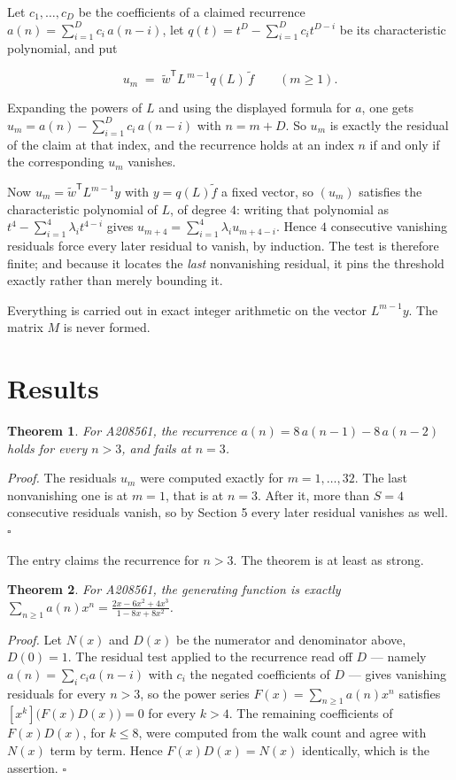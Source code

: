 \documentclass[11pt]{article}
\newtheorem{theorem}{Theorem}
\theoremstyle{definition}
\begin{document}
Let $c_1,\dots,c_D$ be the coefficients of a claimed recurrence $a(n) = \sum_{i=1}^{D} c_i\,a(n-i)$, let $q(t) = t^{D} - \sum_{i=1}^{D} c_i t^{D-i}$ be its characteristic polynomial, and put

\[u_m \;=\; \tilde w^{\mathsf T} L^{\,m-1} q(L)\,\tilde f \qquad (m \ge 1).\]

Expanding the powers of $L$ and using the displayed formula for $a$, one gets $u_m = a(n) - \sum_{i=1}^{D} c_i\,a(n-i)$ with $n = m + D$. So $u_m$ is exactly the residual of the claim at that index, and the recurrence holds at an index $n$ if and only if the corresponding $u_m$ vanishes.

Now $u_m = \tilde w^{\mathsf T} L^{m-1} y$ with $y = q(L)\tilde f$ a fixed vector, so $(u_m)$ satisfies the characteristic polynomial of $L$, of degree $4$: writing that polynomial as $t^{4} - \sum_{i=1}^{4} \lambda_i t^{4-i}$ gives $u_{m+4} = \sum_{i=1}^{4} \lambda_i u_{m+4-i}$. Hence $4$ consecutive vanishing residuals force every later residual to vanish, by induction. The test is therefore finite; and because it locates the {\itshape last} nonvanishing residual, it pins the threshold exactly rather than merely bounding it.

Everything is carried out in exact integer arithmetic on the vector $L^{m-1}y$. The matrix $M$ is never formed.

\section{Results}

\begin{theorem} For A208561, the recurrence $a(n) = 8\,a(n-1) - 8\,a(n-2)$ holds for every $n > 3$, and fails at $n = 3$.\end{theorem}

{\itshape Proof.} The residuals $u_m$ were computed exactly for $m = 1,\dots,32$. The last nonvanishing one is at $m = 1$, that is at $n = 3$. After it, more than $S = 4$ consecutive residuals vanish, so by Section 5 every later residual vanishes as well. $\square$

The entry claims the recurrence for $n > 3$. The theorem is at least as strong.

\begin{theorem} For A208561, the generating function is exactly $\sum_{n\ge 1} a(n)x^n = \frac{2x - 6x^{2} + 4x^{3}}{1 - 8x + 8x^{2}}$.\end{theorem}

{\itshape Proof.} Let $N(x)$ and $D(x)$ be the numerator and denominator above, $D(0)=1$. The residual test applied to the recurrence read off $D$ --- namely $a(n) = \sum_i c_i a(n-i)$ with $c_i$ the negated coefficients of $D$ --- gives vanishing residuals for every $n > 3$, so the power series $F(x)=\sum_{n\ge 1}a(n)x^n$ satisfies $[x^k]\bigl(F(x)D(x)\bigr) = 0$ for every $k > 4$. The remaining coefficients of $F(x)D(x)$, for $k \le 8$, were computed from the walk count and agree with $N(x)$ term by term. Hence $F(x)D(x) = N(x)$ identically, which is the assertion. $\square$
\end{document}
